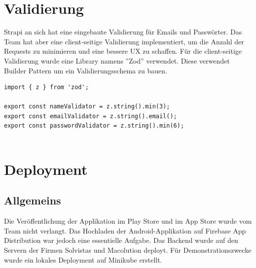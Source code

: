 \section{Validierung}
Strapi an sich hat eine eingebaute Validierung für Emails und Passwörter. Das Team hat aber eine client-seitige Validierung implementiert, um die Anzahl der Requests zu minimieren und eine bessere UX zu schaffen.
Für die client-seitige Validierung wurde eine Library namens ''Zod'' verwendet. Diese verwendet Builder Pattern um ein Validierungsschema zu bauen.
\begin{lstlisting}[caption=Validierungsschemen]
 import { z } from 'zod';

export const nameValidator = z.string().min(3);
export const emailValidator = z.string().email();
export const passwordValidator = z.string().min(6);
  
\end{lstlisting}


\section{Deployment}

\subsection{Allgemeins}

Die Veröffentlichung der Applikation im Play Store und im App Store wurde vom Team nicht verlangt.
Das Hochladen der Android-Applikation auf Firebase App Distribution war jedoch eine essentielle Aufgabe.
Das Backend wurde auf den Servern der Firmen Solvistas und Macolution deployt. Für Demonstrationszwecke wurde ein lokales Deployment auf Minikube erstellt.



